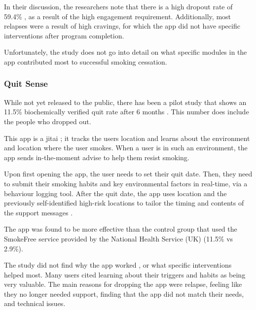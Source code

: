 In their discussion, the researchers note that there is a high dropout rate of 59.4\% \cite{goldgofEfficacyQuitSureApp2024}, as a result of the high engagement requirement. 
Additionally, most relapses were a result of high cravings, for which the app did not have specific interventions after program completion.

Unfortunately, the study does not go into detail on what specific modules in the app contributed most to successful smoking cessation.

\subsubsection{Quit Sense}

While not yet released to the public, there has been a pilot study that shows an 11.5\% biochemically verified quit rate after 6 months \cite{naughtonSmokingCessationSmartphone2024}. This number does include the people who dropped out.

This app is a \ac{jitai} \cite{naughtonSmokingCessationSmartphone2024}; it tracks the users location and learns about the environment and location where the user smokes. When a user is in such an environment, the app sends in-the-moment advise to help them resist smoking.

Upon first opening the app, the user needs to set their quit date. Then, they need to submit their smoking habits and key environmental factors in real-time, via a behaviour logging tool.
After the quit date, the app uses location and the previously self-identified high-risk locations to tailor the timing and contents of the support messages \cite{naughtonSmokingCessationSmartphone2024}.

The app was found to be more effective than the control group that used the SmokeFree service \cite{naughtonSmokingCessationSmartphone2024} provided by the National Health Service (UK) (11.5\% vs 2.9\%).

The study did not find why the app worked \cite{naughtonSmokingCessationSmartphone2024}, or what specific interventions helped most. Many users cited learning about their triggers and habits as being very valuable.
The main reasons for dropping the app \cite{naughtonSmokingCessationSmartphone2024} were relapse, feeling like they no longer needed support, finding that the app did not match their needs, and technical issues.

